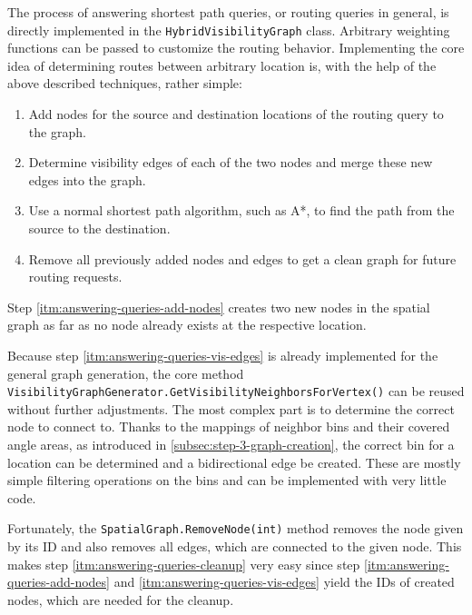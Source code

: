 	The process of answering shortest path queries, or routing queries in general, is directly implemented in the \texttt{HybridVisibilityGraph} class.
	Arbitrary weighting functions can be passed to customize the routing behavior.
	Implementing the core idea of determining routes between arbitrary location is, with the help of the above described techniques, rather simple:
	\begin{enumerate}
		\item \label{itm:answering-queries-add-nodes} Add nodes for the source and destination locations of the routing query to the graph.
		\item \label{itm:answering-queries-vis-edges} Determine visibility edges of each of the two nodes and merge these new edges into the graph.
		\item \label{itm:answering-queries-routing} Use a normal shortest path algorithm, such as A*, to find the path from the source to the destination.
		\item \label{itm:answering-queries-cleanup} Remove all previously added nodes and edges to get a clean graph for future routing requests.
	\end{enumerate}
	Step \ref{itm:answering-queries-add-nodes} creates two new nodes in the spatial graph as far as no node already exists at the respective location.
	
	Because step \ref{itm:answering-queries-vis-edges} is already implemented for the general graph generation, the core method \texttt{VisibilityGraphGenerator.GetVisibilityNeighborsForVertex()} can be reused without further adjustments.
	The most complex part is to determine the correct node to connect to.
	Thanks to the mappings of neighbor bins and their covered angle areas, as introduced in \cref{subsec:step-3-graph-creation}, the correct bin for a location can be determined and a bidirectional edge be created.
	These are mostly simple filtering operations on the bins and can be implemented with very little code.
	
	Fortunately, the \texttt{SpatialGraph.RemoveNode(int)} method removes the node given by its ID and also removes all edges, which are connected to the given node.
	This makes step \ref{itm:answering-queries-cleanup} very easy since step \ref{itm:answering-queries-add-nodes} and \ref{itm:answering-queries-vis-edges} yield the IDs of created nodes, which are needed for the cleanup.
	
